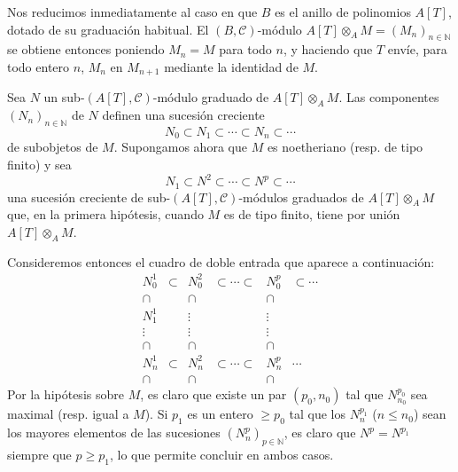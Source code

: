 \begin{prooftext}
Nos reducimos inmediatamente al caso en que \(B\) es el anillo de polinomios \(A[T]\), dotado de su graduación habitual. El \((B,\mathcal C)\)-módulo \(A[T]\otimes_A M=(M_n)_{n\in\mathbb N}\) se obtiene entonces poniendo \(M_n=M\) para todo \(n\), y haciendo que \(T\) envíe, para todo entero \(n\), \(M_n\) en \(M_{n+1}\) mediante la identidad de \(M\).

Sea \(N\) un sub-\((A[T],\mathcal C)\)-módulo graduado de \(A[T]\otimes_A M\). Las componentes \((N_n)_{n\in\mathbb N}\) de \(N\) definen una sucesión creciente
\[
N_0\subset N_1\subset\cdots\subset N_n\subset\cdots
\]
de subobjetos de \(M\). Supongamos ahora que \(M\) es noetheriano (resp. de tipo finito) y sea
\[
N_1\subset N^2\subset\cdots\subset N^p\subset\cdots
\]
una sucesión creciente de sub-\((A[T],\mathcal C)\)-módulos graduados de \(A[T]\otimes_A M\) que, en la primera hipótesis, cuando \(M\) es de tipo finito, tiene por unión \(A[T]\otimes_A M\).

Consideremos entonces el cuadro de doble entrada que aparece a continuación:
\[
\begin{array}{cccccc}
N_0^1&\subset&N_0^2&\subset\cdots\subset&N_0^p&\subset\cdots\\
\cap&&\cap&&\cap\\
N_1^1&&\vdots&&\vdots\\
\vdots&&\vdots&&\vdots\\
\cap&&\cap&&\cap\\
N_n^1&\subset&N_n^2&\subset\cdots\subset&N_n^p&\cdots\\
\cap&&\cap&&\cap
\end{array}
\]
Por la hipótesis sobre \(M\), es claro que existe un par \((p_0,n_0)\) tal que \(N^{p_0}_{n_0}\) sea maximal (resp. igual a \(M\)). Si \(p_1\) es un entero \(\ge p_0\) tal que los \(N_n^{p_1}\) (\(n\le n_0\)) sean los mayores elementos de las sucesiones \((N_n^p)_{p\in\mathbb N}\), es claro que \(N^p=N^{p_1}\) siempre que \(p\ge p_1\), lo que permite concluir en ambos casos.
\end{prooftext}
